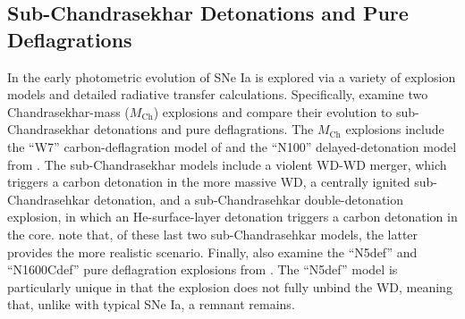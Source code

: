 \documentclass[twocolumn]{aastex61}
\begin{document}
\subsection{Sub-Chandrasekhar Detonations and Pure Deflagrations}

In \citet{2017MNRAS.472.2787N} the early photometric evolution of SNe Ia is
explored via a variety of explosion models and detailed radiative transfer
calculations. Specifically, \citet{2017MNRAS.472.2787N} examine two
Chandrasekhar-mass ($M_\mathrm{Ch}$) explosions and compare their evolution
to sub-Chandrasekhar detonations and pure deflagrations. The $M_\mathrm{Ch}$
explosions include the ``W7'' carbon-deflagration model of
\citet{1984ApJ...286..644N} and the ``N100'' delayed-detonation model from
\citet{2013MNRAS.429.1156S}. The sub-Chandrasekhar models include a violent
WD-WD merger, which triggers a carbon detonation in the more massive WD, a
centrally ignited sub-Chandrasehkar detonation, and a sub-Chandrasehkar
double-detonation explosion, in which an He-surface-layer detonation
triggers a carbon detonation in the core. \citet{2017MNRAS.472.2787N} note
that, of these last two sub-Chandrasehkar models, the latter provides the
more realistic scenario. Finally, \citeauthor{2017MNRAS.472.2787N} also
examine the ``N5def'' and ``N1600Cdef'' pure deflagration explosions from
\citet{2014MNRAS.438.1762F}. The ``N5def'' model is particularly unique in
that the explosion does not fully unbind the WD, meaning that, unlike with
typical SNe Ia, a remnant remains.
\end{document}
